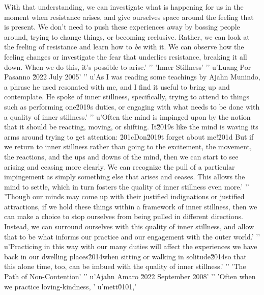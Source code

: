 With that understanding, we can investigate what is happening for us in 
the moment when resistance arises, and give ourselves space around the 
feeling that is present. We don't need to push these experiences away 
by bossing people around, trying to change things, or becoming 
reclusive. Rather, we can look at the feeling of resistance and learn 
how to \emph{be} with it. We can observe how the feeling changes or 
investigate the fear that underlies resistance, breaking it all down. 
When we do this, it's possible to arise.'
'\n'
'Inner Stillness'
'\n'
u'Luang Por Pasanno \u2022 July 2005'
'\n'
u'As I was reading some teachings by Ajahn Munindo, a phrase he used resonated with me, and I find it useful to bring up and contemplate. He spoke of inner stillness, specifically, trying to attend to things such as performing one\u2019s duties, or engaging with what needs to be done with a quality of inner stillness.'
'\n'
u'Often the mind is impinged upon by the notion that it should be reacting, moving, or shifting. It\u2019s like the mind is waving its arms around trying to get attention: \u201cDon\u2019t forget about me!\u201d But if we return to inner stillness rather than going to the excitement, the movement, the reactions, and the ups and downs of the mind, then we can start to see arising and ceasing more clearly. We can recognize the pull of a particular impingement as simply something else that arises and ceases. This allows the mind to settle, which in turn fosters the quality of inner stillness even more.'
'\n'
'Though our minds may come up with their justified indignations or justified attractions, if we hold these things within a framework of inner stillness, then we can make a choice to stop ourselves from being pulled in different directions. Instead, we can surround ourselves with this quality of inner stillness, and allow that to be what informs our practice and our engagement with the outer world.'
'\n'
u'Practicing in this way with our many duties will affect the experiences we have back in our dwelling places\u2014when sitting or walking in solitude\u2014so that this alone time, too, can be imbued with the quality of inner stillness.'
'\n'
'The Path of Non-Contention'
'\n'
u'Ajahn Amaro \u2022 September 2008'
'\n'
'Often when we practice loving-kindness, '
u'mett\u0101,'
